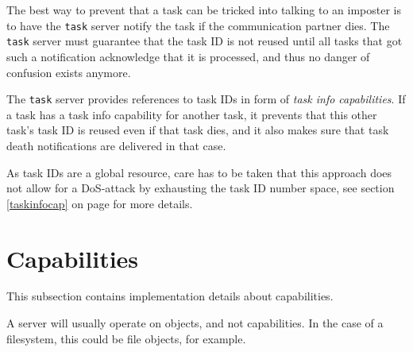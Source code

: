 The best way to prevent that a task can be tricked into talking to an
imposter is to have the \texttt{task} server notify the task if the
communication partner dies.  The \texttt{task} server must guarantee
that the task ID is not reused until all tasks that got such a
notification acknowledge that it is processed, and thus no danger of
confusion exists anymore.

The \texttt{task} server provides references to task IDs in form of
\emph{task info capabilities}.  If a task has a task info capability
for another task, it prevents that this other task's task ID is reused
even if that task dies, and it also makes sure that task death
notifications are delivered in that case.

\begin{comment}
  Because only the \texttt{task} server can create and destroy tasks,
  and assign task IDs, there is no need to hold such task info
  capabilities for the \texttt{task} server, nor does the
  \texttt{task} server need to hold task info capabilities for its
  clients.  This avoids the obvious bootstrap problem in providing
  capabilities in the \texttt{task} server.  This will even work if
  the \texttt{task} server is not the real \texttt{task} server, but a
  proxy task server (see section \ref{proxytaskserver} on page
  \pageref{proxytaskserver}).
\end{comment}

As task IDs are a global resource, care has to be taken that this
approach does not allow for a DoS-attack by exhausting the task ID
number space, see section \ref{taskinfocap} on page
\pageref{taskinfocap} for more details.


\section{Capabilities}

This subsection contains implementation details about capabilities.

A server will usually operate on objects, and not capabilities.  In
the case of a filesystem, this could be file objects, for example.

\begin{comment}
  In the Hurd, filesystem servers have to keep different objects for
  each time a file is looked up (or ``opened''), because some state,
  for example authentication, open flags and record locks, are
  associated not with the file directly, but with this instance of
  opening the file.  Such a state structure (``credential'') will also
  contain a pointer and reference to the actual file node.  For
  simplicity, we will assume that the capability is associated with a
  file node directly.
\end{comment}

